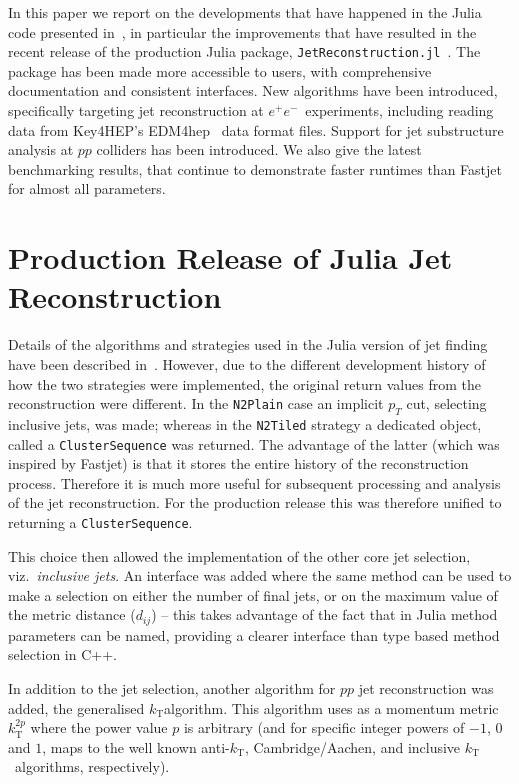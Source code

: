 \documentclass{webofc}
\newcommand{\kt}{${k}_\text{T}$}
\newcommand{\akt}{anti-${k}_\text{T}$}
\newcommand{\JR}{\texttt{JetReconstruction.jl}}
\newcommand{\ee}{$e^+e^-$}
\begin{document}
In this paper we report on the developments that have happened in the Julia code
presented in~\cite{polyglot-jets-chep23}, in particular the improvements that
have resulted in the recent release of the production Julia package,
\JR~\cite{jetreconstruction-jl-github}. The package has been made more
accessible to users, with comprehensive documentation and consistent interfaces.
New algorithms have been introduced, specifically targeting jet reconstruction
at \ee\ experiments, including reading data from Key4HEP's
EDM4hep~\cite{Gaede:2022leb} data format files. Support for jet substructure
analysis at $pp$ colliders has been introduced. We also give the latest
benchmarking results, that continue to demonstrate faster runtimes than
Fastjet~\cite{Cacciari:2011ma} for almost all parameters.

\section{Production Release of Julia Jet Reconstruction}
\label{sec:prodrel}

Details of the algorithms and strategies used in the Julia version of jet
finding have been described in~\cite{polyglot-jets-chep23}. However, due to the
different development history of how the two strategies were implemented, the
original return values from the reconstruction were different. In the
\texttt{N2Plain} case an implicit $p_T$ cut, selecting inclusive jets, was made;
whereas in the \texttt{N2Tiled} strategy a dedicated object, called a
\texttt{ClusterSequence} was returned. The advantage of the latter (which was
inspired by Fastjet) is that it stores the entire history of the reconstruction
process. Therefore it is much more useful for subsequent processing and analysis
of the jet reconstruction. For the production release this was therefore unified
to returning a \texttt{ClusterSequence}.

This choice then allowed the implementation of the other core jet selection, viz.\
\emph{inclusive jets}. An interface was added where the same method can be used
to make a selection on either the number of final jets, or on the maximum value
of the metric distance ($d_{ij}$) -- this takes advantage of the fact that in
Julia method parameters can be named, providing a clearer interface than type
based method selection in C++.

In addition to the jet selection, another algorithm for $pp$ jet reconstruction
was added, the generalised \kt algorithm. This algorithm uses as a momentum
metric $k^{2p}_\text{T}$ where the power value $p$ is arbitrary (and for
specific integer powers of $-1$, $0$ and $1$, maps to the well known \akt,
Cambridge/Aachen, and inclusive \kt\ algorithms, respectively).
\end{document}
